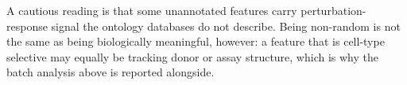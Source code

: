 A cautious reading is that some unannotated features carry perturbation-response signal the
ontology databases do not describe. Being non-random is not the same as being biologically
meaningful, however: a feature that is cell-type selective may equally be tracking donor or assay
structure, which is why the batch analysis above is reported alongside.
